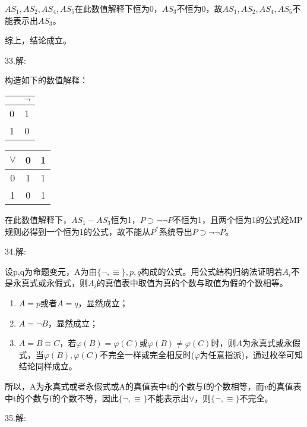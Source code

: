 \documentclass[a4paper]{ctexart}
\begin{document}
\begin{enumerate}
  $AS_1,AS_2,AS_4,AS_5$在此数值解释下恒为0，$AS_3$不恒为0，故$AS_1,AS_2,AS_4,AS_5$不能表示出$AS_3$。
  
  综上，结论成立。
\end{enumerate}

\noindent 33.解:

构造如下的数值解释：
\begin{table}[!hbp]
  \begin{tabular}{c|c}
    & $\neg$ \\
    \hline
    0 & 1 \\
    1 & 0 \\
  \end{tabular}
  \hfil
  \begin{tabular}{c|cc}
    $\vee$ & 0 & 1  \\
    \hline
    0 & 1 & 1  \\
    1 & 0 & 1  \\
  \end{tabular}    
\end{table}

在此数值解释下，$AS_1-AS_3$恒为1，$P\supset \neg\neg P$不恒为1，且两个恒为1的公式经MP规则必得到一个恒为1的公式，故不能从$P^*$系统导出$P\supset \neg\neg P$。

\noindent 34.解:

设p,q为命题变元，A为由$\{\neg,\equiv\},p,q$构成的公式。用公式结构归纳法证明若$A_i$不是永真式或永假式，则$A_i$的真值表中取值为真的个数与取值为假的个数相等。
\begin{enumerate}
  \item $A=p$或者$A=q$，显然成立；
  \item $A=\neg B$，显然成立；
  \item $A=B\equiv C$，若$\varphi(B)=\varphi(C)$或$\varphi(B)\neq\varphi(C)$时，则$A$为永真式或永假式，当$\varphi(B),\varphi(C)$不完全一样或完全相反时($\varphi$为任意指派)，通过枚举可知结论同样成立。
\end{enumerate}
所以，A为永真式或者永假式或A的真值表中t的个数与f的个数相等，而$v$的真值表中t的个数与f的个数不等，因此$\{\neg,\equiv\}$不能表示出$\vee$，则$\{\neg,\equiv\}$不完全。\newline

\noindent 35.解:
\end{document}
